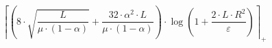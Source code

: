 \[\left\lceil \left(8 \cdot \sqrt{\frac{L}{\mu \cdot \left(1 - \alpha\right)}} + \frac{32 \cdot \alpha^{2} \cdot L}{\mu \cdot \left(1 - \alpha\right)}\right) \cdot \log\left(1 + \frac{2 \cdot L \cdot R^{2}}{\varepsilon}\right) \right\rceil_{+}\]

